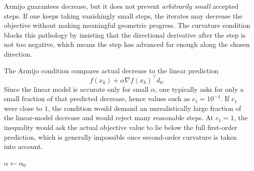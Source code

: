 \begin{remark}
	Armijo guarantees decrease, but it does not prevent \emph{arbitrarily small} accepted steps. If one keeps taking vanishingly small steps, the iterates may decrease the objective without making meaningful geometric progress. The curvature condition blocks this pathology by insisting that the directional derivative after the step is not too negative, which means the step has advanced far enough along the chosen direction.
\end{remark}

\begin{remark}
	The Armijo condition compares actual decrease to the linear prediction
	\[
		f(x_k)+\alpha \nabla f(x_k)^\top d_k.
	\]
	Since the linear model is accurate only for small $\alpha$, one typically asks for only a small fraction of that predicted decrease, hence values such as $c_1=10^{-4}$. If $c_1$ were close to $1$, the condition would demand an unrealistically large fraction of the linear-model decrease and would reject many reasonable steps. At $c_1=1$, the inequality would ask the actual objective value to lie below the full first-order prediction, which is generally impossible once second-order curvature is taken into account.
\end{remark}

\begin{algorithm}[H]
	\DontPrintSemicolon
	\caption{Backtracking Line Search}
\label{alg:l2-backtracking-line-search}
	$\alpha \leftarrow \alpha_0$\;
\end{algorithm}


